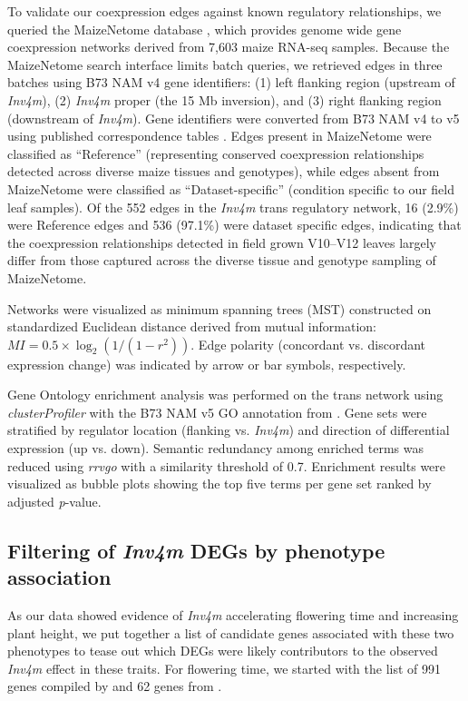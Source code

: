 \documentclass[9pt,twocolumn,twoside]{rilabRxiv}
\newcommand{\invfour}{\textit{Inv4m}\xspace}
\begin{document}
To validate our coexpression edges against known regulatory relationships, we queried the MaizeNetome database \cite{feng2023}, which provides genome wide gene coexpression networks derived from 7,603 maize RNA-seq samples.
Because the MaizeNetome search interface limits batch queries, we retrieved edges in three batches using B73 NAM v4 gene identifiers: (1) left flanking region (upstream of \invfour), (2) \invfour proper (the 15 Mb inversion), and (3) right flanking region (downstream of \invfour).
Gene identifiers were converted from B73 NAM v4 to v5 using published correspondence tables \cite{hufford2021}.
Edges present in MaizeNetome were classified as ``Reference'' (representing conserved coexpression relationships detected across diverse maize tissues and genotypes), while edges absent from MaizeNetome were classified as ``Dataset-specific'' (condition specific to our field leaf samples).
Of the 552 edges in the \invfour trans regulatory network, 16 (2.9\%) were Reference edges and 536 (97.1\%) were dataset specific edges, indicating that the coexpression relationships detected in field grown V10--V12 leaves largely differ from those captured across the diverse tissue and genotype sampling of MaizeNetome.

Networks were visualized as minimum spanning trees (MST) constructed on standardized Euclidean distance derived from mutual information: $MI = 0.5 \times \log_2(1/(1-r^2))$.
Edge polarity (concordant vs. discordant expression change) was indicated by arrow or bar symbols, respectively.

Gene Ontology enrichment analysis was performed on the trans network using \textit{clusterProfiler} \cite{yu2012} with the B73 NAM v5 GO annotation from \cite{fattel2024}.
Gene sets were stratified by regulator location (flanking vs. \invfour) and direction of differential expression (up vs. down).
Semantic redundancy among enriched terms was reduced using \textit{rrvgo} \cite{sayols2023} with a similarity threshold of 0.7.
Enrichment results were visualized as bubble plots showing the top five terms per gene set ranked by adjusted \textit{p}-value.


\subsection{Filtering of \invfour DEGs by phenotype association}

As our data showed evidence of \invfour accelerating flowering time and increasing plant height, we put together a list of candidate genes associated with these two phenotypes to tease out which DEGs were likely contributors to the observed \invfour effect in these traits.
For flowering time, we started with the list of 991 genes compiled by \cite{wang2021} and 62 genes from \cite{li2023a}.
\end{document}
